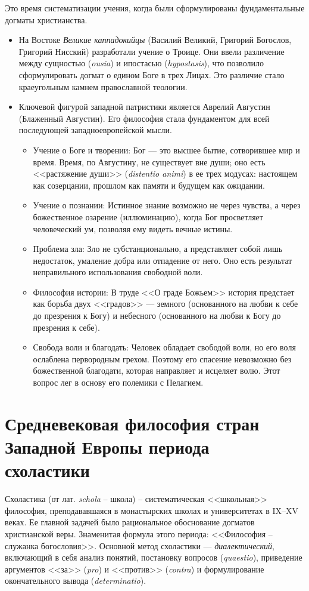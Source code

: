\documentclass[12pt,a4paper]{article}
\begin{document}
	Это время систематизации учения, когда были сформулированы фундаментальные догматы христианства.
	\begin{itemize}
		\item На Востоке \textit{Великие каппадокийцы} (Василий Великий, Григорий Богослов, Григорий Нисский) разработали учение о Троице. Они ввели различение между сущностью (\textit{ousia}) и ипостасью (\textit{hypostasis}), что позволило сформулировать догмат о едином Боге в трех Лицах. Это различие стало краеугольным камнем православной теологии.
		\item Ключевой фигурой западной патристики является Аврелий Августин (Блаженный Августин). Его философия стала фундаментом для всей последующей западноевропейской мысли.
		\begin{itemize}
			\item Учение о Боге и творении: Бог — это высшее бытие, сотворившее мир и время. Время, по Августину, не существует вне души; оно есть <<растяжение души>> (\textit{distentio animi}) в ее трех модусах: настоящем как созерцании, прошлом как памяти и будущем как ожидании.
			\item Учение о познании: Истинное знание возможно не через чувства, а через божественное озарение (иллюминацию), когда Бог просветляет человеческий ум, позволяя ему видеть вечные истины.
			\item Проблема зла: Зло не субстанционально, а представляет собой лишь недостаток, умаление добра или отпадение от него. Оно есть результат неправильного использования свободной воли.
			\item Философия истории: В труде <<О граде Божьем>> история предстает как борьба двух <<градов>> --- земного (основанного на любви к себе до презрения к Богу) и небесного (основанного на любви к Богу до презрения к себе).
			\item Свобода воли и благодать: Человек обладает свободой воли, но его воля ослаблена первородным грехом. Поэтому его спасение невозможно без божественной благодати, которая направляет и исцеляет волю. Этот вопрос лег в основу его полемики с Пелагием.
		\end{itemize}
	\end{itemize}
	
	\section{Средневековая философия стран Западной Европы периода схоластики~\checkmark}
	
	Схоластика (от лат. \textit{schola} -- школа) -- систематическая <<школьная>> философия, преподававшаяся в монастырских школах и университетах в IX--XV веках. Ее главной задачей было рациональное обоснование догматов христианской веры. Знаменитая формула этого периода: <<Философия -- служанка богословия>>. Основной метод схоластики — \textit{диалектический}, включающий в себя анализ понятий, постановку вопросов (\textit{quaestio}), приведение аргументов <<за>> (\textit{pro}) и <<против>> (\textit{contra}) и формулирование окончательного вывода (\textit{determinatio}).
\end{document}
